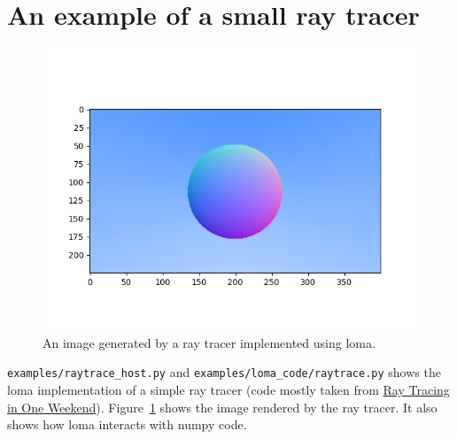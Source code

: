 \section{An example of a small ray tracer}
\begin{figure}
\centering
\includegraphics[width=0.8\linewidth]{imgs/raytrace.png}
\vspace{-20pt}
\caption{An image generated by a ray tracer implemented using loma.}
\label{fig:raytrace}
\end{figure}

\lstinline{examples/raytrace_host.py} and \lstinline{examples/loma_code/raytrace.py} shows the loma implementation of a simple ray tracer (code mostly taken from \href{https://raytracing.github.io/books/RayTracingInOneWeekend.html}{Ray Tracing in One Weekend}). Figure~\ref{fig:raytrace} shows the image rendered by the ray tracer. It also shows how loma interacts with numpy code.


